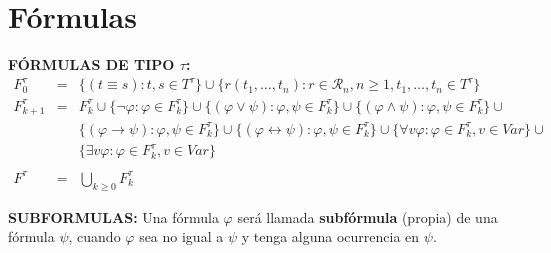 \section{Fórmulas}

\PN \textbf{FÓRMULAS DE TIPO $\tau$:}
	\begin{eqnarray*}
		F_{0}^{\tau} &=& \{(t \equiv s): t, s \in T^{\tau}\} \cup \{r(t_{1}, \dotsc, t_{n}): r \in \mathcal{R}_{n}, n \geq
			1, t_{1}, \dotsc, t_{n} \in T^{\tau}\} \\
		F_{k+1}^{\tau} &=& F_{k}^{\tau} \cup \{\lnot \varphi: \varphi \in F_{k}^{\tau}\} \cup \{(\varphi \vee \psi):
			\varphi, \psi \in F_{k}^{\tau}\} \cup \{(\varphi \wedge \psi): \varphi, \psi \in F_{k}^{\tau}\} \cup \\
		&& \{(\varphi \rightarrow \psi): \varphi, \psi \in F_{k}^{\tau}\} \cup \{(\varphi \leftrightarrow \psi): \varphi,
			\psi \in F_{k}^{\tau}\} \cup \{\forall v \varphi: \varphi \in F_{k}^{\tau}, v \in Var\} \cup \\
		&& \{\exists v\varphi :\varphi \in F_{k}^{\tau}, v \in Var\} \\
		\\
		F^{\tau} &=& \bigcup_{k \geq  0} F_{k}^{\tau}
	\end{eqnarray*}

	\vspace{3mm}
	\PN \textbf{SUBFORMULAS:}
  \PN Una fórmula $\varphi$ será llamada \textbf{subfórmula} (propia) de una fórmula $\psi$, cuando $\varphi$ sea no
  igual a $\psi$ y tenga alguna ocurrencia en $\psi$.
